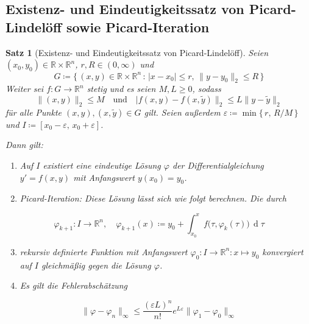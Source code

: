 \documentclass[a4paper, 11pt, accentcolor = tud3b]{tudreport}
\newtheorem{theorem}{Satz}[chapter]
\DeclareMathOperator{\total}{d}
\newcommand{\dif}[1]{\,\total#1}
\newcommand{\R}{\mathbb{R}}
\begin{document}
			\subsection{Existenz- und Eindeutigkeitssatz von Picard-Lindelöff sowie Picard-Iteration}
				\begin{theorem}[Existenz- und Eindeutigkeitssatz von Picard-Lindelöff]
					Seien \( (x_0, y_0) \in \R \times \R^n \), \( r, R \in (0, \infty) \) und
					\begin{equation*}
						G \coloneqq \big\{\, (x, y) \in \R \times \R^n \,:\, \lvert x - x_0 \rvert \leq r,\, \lVert y - y_0 \rVert_2 \leq R \,\big\}
					\end{equation*}
					Weiter sei \( f : G \to \R^n \) stetig und es seien \( M, L \geq 0 \), sodass
					\begin{equation*}
						\lVert (x, y) \rVert_2 \leq M \quad\text{und}\quad \lvert f(x, y) - f(x, \tilde{y}) \rVert_2 \leq L \lVert y - \tilde{y} \rVert_2
					\end{equation*}
					für alle Punkte \( (x, y), (x, \tilde{y}) \in G \) gilt. Seien außerdem \( \varepsilon \coloneqq \min \big\{\, r,\, R/M \,\} \) und \( I \coloneqq [x_0 - \varepsilon,\, x_0 + \varepsilon] \).
					
					Dann gilt:
					\begin{enumerate}
						\item Auf \(I\) existiert eine eindeutige Lösung \(\varphi\) der Differentialgleichung \( y' = f(x, y) \) mit Anfangswert \( y(x_0) = y_0 \).
						\item \emph{Picard-Iteration}: Diese Lösung lässt sich wie folgt berechnen. Die durch
					\end{enumerate}
					\begin{equation*}
						\varphi_{k + 1} : I \to \R^n,\quad \varphi_{k + 1}(x) \coloneqq y_0 + \int_{x_0}^{x} \! f\big(\tau, \varphi_k(\tau)\big) \dif{\tau}
					\end{equation*}
					\begin{enumerate}
						\setcounter{enumi}{2}
						\item[] rekursiv definierte Funktion mit Anfangswert \( \varphi_0 : I \to \R^n : x \mapsto y_0 \) konvergiert auf \(I\) gleichmäßig gegen die Lösung \(\varphi\).
						\item Es gilt die Fehlerabschätzung
					\end{enumerate}
					\begin{equation*}
						\lVert \varphi - \varphi_n \rVert_\infty \leq \frac{(\varepsilon L)^n}{n!} e^{L \varepsilon} \lVert \varphi_1 - \varphi_0 \rVert_\infty
					\end{equation*}
				\end{theorem}
\end{document}

